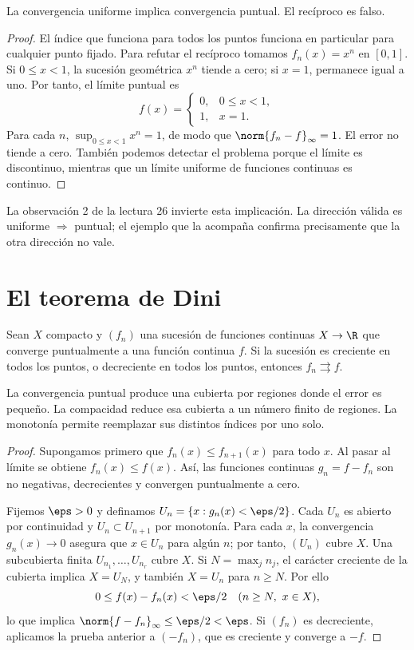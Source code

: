 \begin{proposicion}
La convergencia uniforme implica convergencia puntual. El recíproco es falso.
\end{proposicion}
\begin{proof}
El índice que funciona para todos los puntos funciona en particular para cualquier punto fijado. Para refutar el recíproco tomamos $f_n(x)=x^n$ en $[0,1]$. Si $0\le x<1$, la sucesión geométrica $x^n$ tiende a cero; si $x=1$, permanece igual a uno. Por tanto, el límite puntual es
\[
 f(x)=\begin{cases}0,&0\le x<1,\\1,&x=1.\end{cases}
\]
Para cada $n$, $\sup_{0\le x<1}x^n=1$, de modo que $\norm{f_n-f}_\infty=1$. El error no tiende a cero. También podemos detectar el problema porque el límite es discontinuo, mientras que un límite uniforme de funciones continuas es continuo.
\end{proof}

\begin{observacion}
La observación 2 de la lectura 26 invierte esta implicación. La dirección válida es uniforme $\Rightarrow$ puntual; el ejemplo que la acompaña confirma precisamente que la otra dirección no vale.
\end{observacion}

\section{El teorema de Dini}
\begin{teorema}[Dini]\label{ch26:dini}
Sean $X$ compacto y $(f_n)$ una sucesión de funciones continuas $X\to\R$ que converge puntualmente a una función continua $f$. Si la sucesión es creciente en todos los puntos, o decreciente en todos los puntos, entonces $f_n\rightrightarrows f$.
\end{teorema}
\begin{estrategia}
La convergencia puntual produce una cubierta por regiones donde el error es pequeño. La compacidad reduce esa cubierta a un número finito de regiones. La monotonía permite reemplazar sus distintos índices por uno solo.
\end{estrategia}
\begin{proof}
Supongamos primero que $f_n(x)\le f_{n+1}(x)$ para todo $x$. Al pasar al límite se obtiene $f_n(x)\le f(x)$. Así, las funciones continuas $g_n=f-f_n$ son no negativas, decrecientes y convergen puntualmente a cero.

Fijemos $\eps>0$ y definamos $U_n=\{x:g_n(x)<\eps/2\}$. Cada $U_n$ es abierto por continuidad y $U_n\subset U_{n+1}$ por monotonía. Para cada $x$, la convergencia $g_n(x)\to0$ asegura que $x\in U_n$ para algún $n$; por tanto, $(U_n)$ cubre $X$. Una subcubierta finita $U_{n_1},\ldots,U_{n_r}$ cubre $X$. Si $N=\max_j n_j$, el carácter creciente de la cubierta implica $X=U_N$, y también $X=U_n$ para $n\ge N$. Por ello
\[
 0\le f(x)-f_n(x)<\eps/2\quad(n\ge N,\ x\in X),
\]
lo que implica $\norm{f-f_n}_\infty\le\eps/2<\eps$. Si $(f_n)$ es decreciente, aplicamos la prueba anterior a $(-f_n)$, que es creciente y converge a $-f$.
\end{proof}

